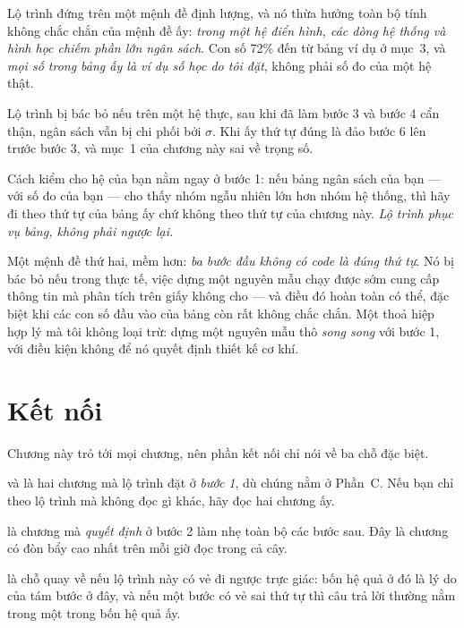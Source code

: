 \documentclass[../../marker.tex]{subfiles}
\begin{document}
Lộ trình đứng trên một mệnh đề định lượng, và nó thừa hưởng toàn bộ tính không chắc chắn của mệnh đề ấy: \emph{trong một hệ điển hình, các dòng hệ thống và hình học chiếm phần lớn ngân sách}. Con số 72\% đến từ bảng ví dụ ở  mục~3, và \emph{mọi số trong bảng ấy là ví dụ số học do tôi đặt}, không phải số đo của một hệ thật.

Lộ trình bị bác bỏ nếu trên một hệ thực, sau khi đã làm bước 3 và bước 4 cẩn thận, ngân sách vẫn bị chi phối bởi \(\sigma\). Khi ấy thứ tự đúng là đảo bước 6 lên trước bước 3, và mục~1 của chương này sai về trọng số.

Cách kiểm cho hệ của bạn nằm ngay ở bước 1: nếu bảng ngân sách của bạn --- với số đo của bạn --- cho thấy nhóm ngẫu nhiên lớn hơn nhóm hệ thống, thì hãy đi theo thứ tự của bảng ấy chứ không theo thứ tự của chương này. \emph{Lộ trình phục vụ bảng, không phải ngược lại.}

Một mệnh đề thứ hai, mềm hơn: \emph{ba bước đầu không có code là đúng thứ tự}. Nó bị bác bỏ nếu trong thực tế, việc dựng một nguyên mẫu chạy được sớm cung cấp thông tin mà phân tích trên giấy không cho --- và điều đó hoàn toàn có thể, đặc biệt khi các con số đầu vào của bảng còn rất không chắc chắn. Một thoả hiệp hợp lý mà tôi không loại trừ: dựng một nguyên mẫu thô \emph{song song} với bước 1, với điều kiện không để nó quyết định thiết kế cơ khí.

\section{Kết nối}

Chương này trỏ tới mọi chương, nên phần kết nối chỉ nói về ba chỗ đặc biệt.

 và  là hai chương mà lộ trình đặt ở \emph{bước 1}, dù chúng nằm ở Phần~C. Nếu bạn chỉ theo lộ trình mà không đọc gì khác, hãy đọc hai chương ấy.

 là chương mà \emph{quyết định} ở bước 2 làm nhẹ toàn bộ các bước sau. Đây là chương có đòn bẩy cao nhất trên mỗi giờ đọc trong cả cây.

 là chỗ quay về nếu lộ trình này có vẻ đi ngược trực giác: bốn hệ quả ở đó là lý do của tám bước ở đây, và nếu một bước có vẻ sai thứ tự thì câu trả lời thường nằm trong một trong bốn hệ quả ấy.
\end{document}
